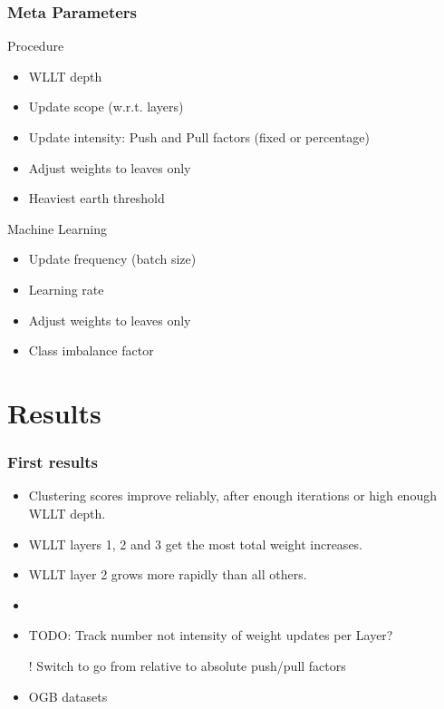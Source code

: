 \begin{frame}
	\frametitle{Meta Parameters}
	Procedure
	\begin{itemize}		
		\item WLLT depth
		\item Update scope (w.r.t. layers)
		\item Update intensity: Push and Pull factors (fixed or percentage)
		\item Adjust weights to leaves only
		\item Heaviest earth threshold
	\end{itemize}
	
	Machine Learning
	\begin{itemize}
		\item Update frequency (batch size)
		\item Learning rate
		\item Adjust weights to leaves only
		\item Class imbalance factor
	\end{itemize}
\end{frame}



\section{Results}

\begin{frame}
	\frametitle{First results}
	\begin{itemize}
		\item Clustering scores improve reliably, after enough iterations or high enough WLLT depth.
		\item WLLT layers 1, 2 and 3 get the most total weight increases.
		\item WLLT layer 2 grows more rapidly than all others.
		\item 
		\item TODO: Track number not intensity of weight updates per Layer?
		\item[!] Switch to go from relative to absolute push/pull factors
		\item OGB datasets
	\end{itemize}
\end{frame}

